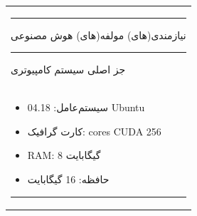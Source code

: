 \documentclass[a4paper,10pt]{article}
\begin{document}
\begin{table}[htbp]
\begin{tabularx}{\textwidth}{ X }
            \vspace{3pt}

            \hrule

            \vspace{3pt}

            نیازمندی(های) مولفه(های) هوش مصنوعی

            \vspace{3pt}

            \hrule

            \vspace{3pt}

            جز اصلی سیستم کامپیوتری \\

            \vspace{-10pt}

            \begin{itemize}
                
                \item سیستم‌عامل: 04.18 Ubuntu
                
                \item کارت گرافیک: cores CUDA 256
                
                \item RAM: 8 گیگابایت
                
                \item حافظه: 16 گیگابایت

            \end{itemize}

            \hrule

        \end{tabularx}

    \end{table}

    \newpage

\end{document}
